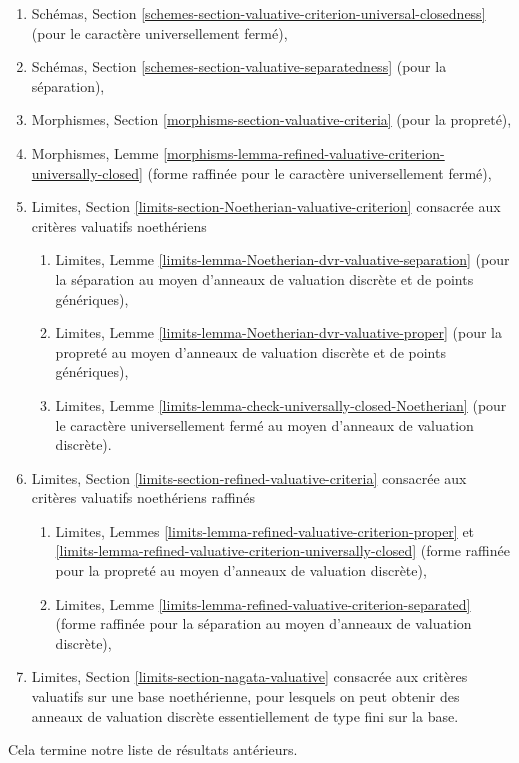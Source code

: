 \begin{enumerate}
\item Schémas, Section
\ref{schemes-section-valuative-criterion-universal-closedness}
(pour le caractère universellement fermé),
\item Schémas, Section \ref{schemes-section-valuative-separatedness}
(pour la séparation),
\item Morphismes, Section \ref{morphisms-section-valuative-criteria}
(pour la propreté),
\item Morphismes, Lemme
\ref{morphisms-lemma-refined-valuative-criterion-universally-closed}
(forme raffinée pour le caractère universellement fermé),
\item Limites, Section \ref{limits-section-Noetherian-valuative-criterion}
consacrée aux critères valuatifs noethériens
\begin{enumerate}
\item Limites, Lemme \ref{limits-lemma-Noetherian-dvr-valuative-separation}
(pour la séparation au moyen d'anneaux de valuation discrète et de points génériques),
\item Limites, Lemme \ref{limits-lemma-Noetherian-dvr-valuative-proper}
(pour la propreté au moyen d'anneaux de valuation discrète et de points génériques),
\item Limites, Lemme \ref{limits-lemma-check-universally-closed-Noetherian}
(pour le caractère universellement fermé au moyen d'anneaux de valuation discrète).
\end{enumerate}
\item Limites, Section \ref{limits-section-refined-valuative-criteria}
consacrée aux critères valuatifs noethériens raffinés
\begin{enumerate}
\item Limites, Lemmes
\ref{limits-lemma-refined-valuative-criterion-proper} et
\ref{limits-lemma-refined-valuative-criterion-universally-closed}
(forme raffinée pour la propreté au moyen d'anneaux de valuation discrète),
\item Limites, Lemme \ref{limits-lemma-refined-valuative-criterion-separated}
(forme raffinée pour la séparation au moyen d'anneaux de valuation discrète),
\end{enumerate}
\item Limites, Section \ref{limits-section-nagata-valuative}
consacrée aux critères valuatifs sur une base noethérienne, pour lesquels
on peut obtenir des anneaux de valuation discrète essentiellement de type fini
sur la base.
\end{enumerate}
Cela termine notre liste de résultats antérieurs.

